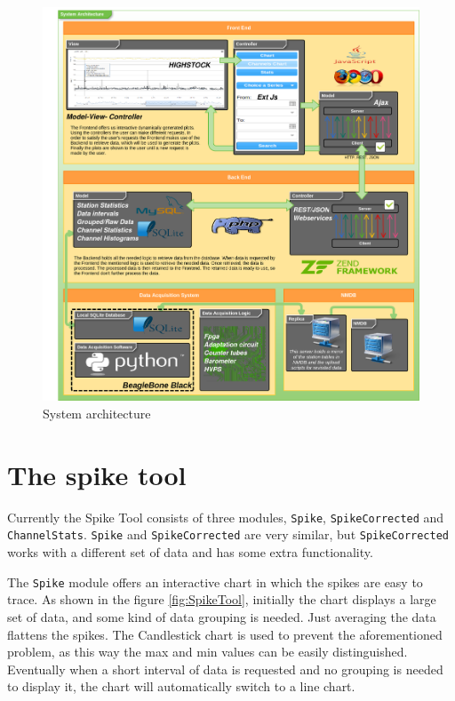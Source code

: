 \documentclass[a4paper]{jpconf}
\begin{document}
\begin{figure}[h]
    \centering
    \includegraphics[keepaspectratio, width=1\textwidth]{./resources/Architecture.png}
    \caption{System architecture}
    \label{fig:arch}
\end{figure}

\section{The spike tool}

Currently the Spike Tool consists of three modules, \texttt{Spike},
\texttt{SpikeCorrected} and \texttt{ChannelStats}. \texttt{Spike} and
\texttt{SpikeCorrected} are very similar, but \texttt{SpikeCorrected} works with
a different set of data and has some extra functionality.

The \texttt{Spike} module offers an interactive chart in which the spikes
are easy to trace. As shown in the figure \ref{fig:SpikeTool}, initially the
chart displays a large set of data, and some kind of data grouping is needed.
Just averaging the data flattens the spikes.  The Candlestick chart is used to
prevent the aforementioned problem, as this way the max and min values can be
easily distinguished. Eventually when a short interval of data is requested and
no grouping is needed to display it, the chart will automatically switch to a
line chart.
\end{document}

